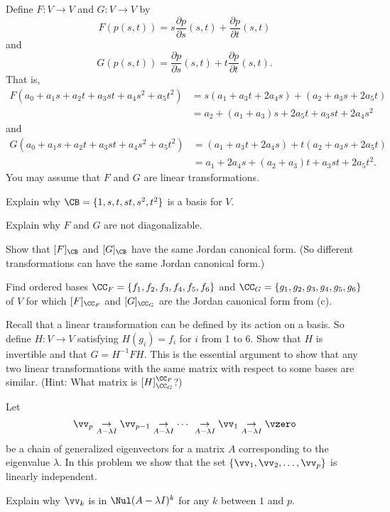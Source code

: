 Define $F: V \to V$ and $G: V \to V$ by 
\[F(p(s,t)) = s\frac{\partial p}{\partial s}(s,t) + \frac{\partial p}{\partial t}(s,t)\]
and  
\[G(p(s,t)) = \frac{\partial p}{\partial s}(s,t) + t\frac{\partial p}{\partial t}(s,t).\]
That is,
\begin{align*}
F(a_0+a_1s+a_2t+a_3st +a_4s^2+a_5t^2) &= s(a_1+a_3t+2a_4s) + (a_2+a_3s+2a_5t) \\
	&= a_2 + (a_1+a_3)s + 2a_5t + a_3st + 2a_4s^2
\end{align*}
and
\begin{align*}
G(a_0+a_1s+a_2t+a_3st +a_4s^2+a_5t^2) &= (a_1+a_3t+2a_4s) + t(a_2+a_3s+2a_5t) \\
	&= a_1 + 2a_4s + (a_2+a_3)t + a_3st + 2a_5t^2.
\end{align*}
You may assume that $F$ and $G$ are linear transformations. 
\ba
\item Explain why $\CB = \{1,s,t,st,s^2,t^2\}$ is a basis for $V$. 
		
\item Explain why $F$ and $G$ are not diagonalizable.
	
\item Show that $[F]_{\CB}$ and  $[G]_{\CB}$ have the same Jordan canonical form. (So different transformations can have the same Jordan canonical form.)

\item Find ordered bases $\CC_F = \{f_1, f_2, f_3, f_4, f_5, f_6\}$ and $\CC_G = \{g_1, g_2, g_3, g_4, g_5, g_6\}$ of $V$ for which $[F]_{\CC_F}$ and $[G]_{\CC_G}$ are the Jordan canonical form from (c).

\item Recall that a linear transformation can be defined by its action on a basis. So define $H : V \to V$ satisfying $H(g_i) = f_i$ for $i$ from 1 to 6. Show that $H$ is invertible and that $G = H^{-1}FH$. This is the essential argument to show that any two linear transformations with the same matrix with respect to some bases are similar. (Hint: What matrix is $[H]_{\CC_G}^{\CC_F}$?)
	
\ea


\item Let 
\[\vv_p \underset{A - \lambda I}{\rightarrow} \vv_{p-1} \underset{A - \lambda I}{\rightarrow}  \cdots \ \underset{A - \lambda I}{\rightarrow} \vv_1 \underset{A - \lambda I}{\rightarrow} \vzero\]
be a chain of generalized eigenvectors for a matrix $A$ corresponding to the eigenvalue $\lambda$. In this problem we show that the set $\{\vv_1, \vv_2, \ldots, \vv_p\}$ is linearly independent. 
	\ba
	\item Explain why $\vv_k$ is in $\Nul (A-\lambda I)^k$ for any $k$ between $1$ and $p$. 
	

